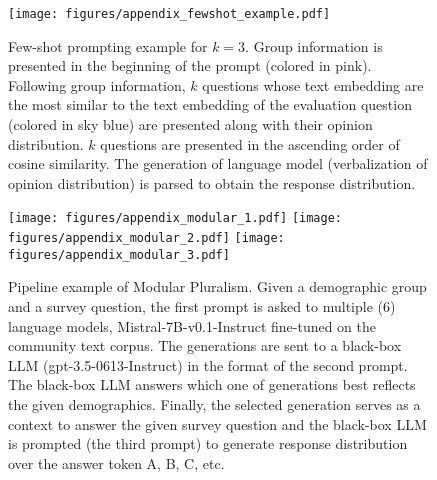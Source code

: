 \begin{figure}[!t]
    \captionsetup{font=small}
    \texttt{[image: figures/appendix\_fewshot\_example.pdf]}
    \caption{
        Few-shot prompting example for $k=3$.
        Group information is presented in the beginning of the prompt (colored in pink).
        Following group information, $k$ questions whose text embedding are the most similar to the text embedding of the evaluation question (colored in sky blue)
        are presented along with their opinion distribution.
        $k$ questions are presented in the ascending order of cosine similarity.
        The generation of language model (verbalization of opinion distribution)
        is parsed to obtain the response distribution.
    }
    \label{fig:fewshot_example}
\end{figure}

\begin{figure}[!t]
    \captionsetup{font=small}
    \texttt{[image: figures/appendix\_modular\_1.pdf]}
    \texttt{[image: figures/appendix\_modular\_2.pdf]}
    \texttt{[image: figures/appendix\_modular\_3.pdf]}
    \caption{
    Pipeline example of Modular Pluralism.
    Given a demographic group and a survey question, the first prompt is asked to
    multiple (6) language models, Mistral-7B-v0.1-Instruct fine-tuned on the community text corpus.
    The generations are sent to a black-box LLM (gpt-3.5-0613-Instruct) in the format of the second prompt.
    The black-box LLM answers which one of generations best reflects the given demographics.
    Finally, the selected generation serves as a context to answer the given survey question
    and the black-box LLM is prompted (the third prompt) to generate response distribution
    over the answer token A, B, C, etc.
    }
    \label{fig:modular_pluralism_example}
\end{figure}
